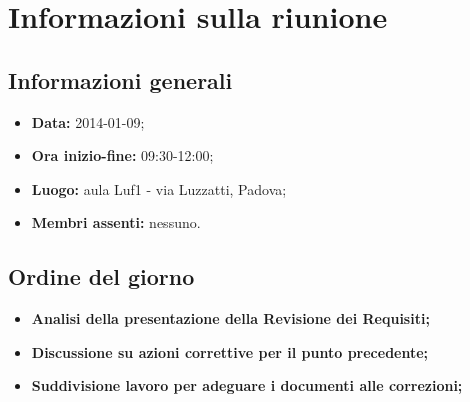 \section{Informazioni sulla riunione}
\label{inforiunione}
\subsection{Informazioni generali}
\label{infogenerali}
\begin{itemize}
\item\textbf{Data:} 2014-01-09;
\item\textbf{Ora inizio-fine:} 09:30-12:00;
\item\textbf{Luogo:} aula Luf1 - via Luzzatti, Padova;
\item\textbf{Membri assenti:} nessuno.
\end{itemize}

\subsection{Ordine del giorno}
\label{odg}
\begin{itemize}
\item\textbf{Analisi della presentazione della Revisione dei Requisiti;}
\item\textbf{Discussione su azioni correttive per il punto precedente;}
\item\textbf{Suddivisione lavoro per adeguare i documenti alle correzioni;}
\end{itemize}